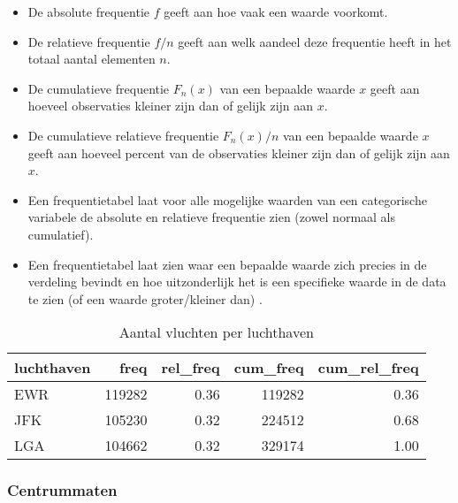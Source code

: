 \documentclass[]{memoir}
\providecommand{\tightlist}{%
  \setlength{\itemsep}{0pt}\setlength{\parskip}{0pt}}
\begin{document}
\begin{itemize}
\tightlist
\item
  De absolute frequentie \(f\) geeft aan hoe vaak een waarde voorkomt.
\item
  De relatieve frequentie \(f/n\) geeft aan welk aandeel deze frequentie
  heeft in het totaal aantal elementen \(n\).
\item
  De cumulatieve frequentie \(F_n(x)\) van een bepaalde waarde \(x\)
  geeft aan hoeveel observaties kleiner zijn dan of gelijk zijn aan
  \(x\).
\item
  De cumulatieve relatieve frequentie \(F_n(x)/n\) van een bepaalde
  waarde \(x\) geeft aan hoeveel percent van de observaties kleiner zijn
  dan of gelijk zijn aan \(x\).
\item
  Een frequentietabel laat voor alle mogelijke waarden van een
  categorische variabele de absolute en relatieve frequentie zien (zowel
  normaal als cumulatief).
\item
  Een frequentietabel laat zien waar een bepaalde waarde zich precies in
  de verdeling bevindt en hoe uitzonderlijk het is een specifieke waarde
  in de data te zien (of een waarde groter/kleiner dan) .
\end{itemize}

\begin{table}[t]

\caption{\label{tab:4-4}Aantal vluchten per luchthaven}
\centering
\fontsize{10}{12}\selectfont
\begin{tabular}{lrrrr}
\toprule
luchthaven & freq & rel\_freq & cum\_freq & cum\_rel\_freq\\
\midrule
EWR & 119282 & 0.36 & 119282 & 0.36\\
JFK & 105230 & 0.32 & 224512 & 0.68\\
LGA & 104662 & 0.32 & 329174 & 1.00\\
\bottomrule
\end{tabular}
\end{table}

\subsubsection*{Centrummaten}\label{centrummaten}
\end{document}
